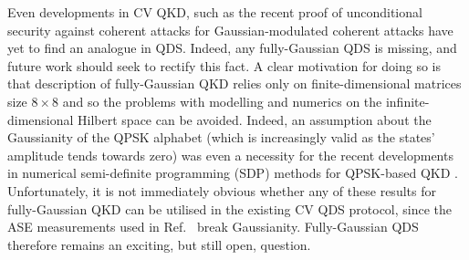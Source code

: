 Even developments in CV QKD, such as the recent proof of unconditional security against coherent attacks for Gaussian-modulated coherent attacks have yet to find an analogue in QDS. Indeed, any fully-Gaussian QDS is missing, and future work should seek to rectify this fact. A clear motivation for doing so is that description of fully-Gaussian QKD relies only on finite-dimensional matrices size $8 \times 8$ \cite{Laudenbach2017} and so the problems with modelling and numerics on the infinite-dimensional Hilbert space can be avoided. Indeed, an assumption about the Gaussianity of the QPSK alphabet (which is increasingly valid as the states' amplitude tends towards zero) was even a necessity for the recent developments in numerical semi-definite programming (SDP) methods for QPSK-based QKD . Unfortunately, it is not immediately obvious whether any of these results for fully-Gaussian QKD can be utilised in the existing CV QDS protocol, since the ASE measurements used in Ref.~\cite{Croal2016} break Gaussianity. Fully-Gaussian QDS therefore remains an exciting, but still open, question.



